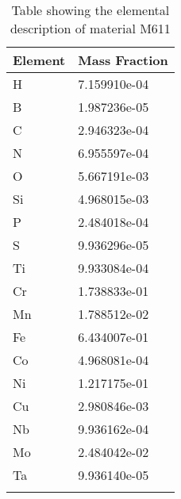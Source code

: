 \begin{centering}
\begin{longtable}[ht!]
\caption{Table showing the elemental description of material M613}
\label{table:material_M613}
\end{longtable}
\clearpage

\begin{longtable}[ht!]
{ p{} | p{} }
\hline
Element & Mass Fraction\\
\hline
H &  7.159910e-04\\
B &  1.987236e-05\\
C &  2.946323e-04\\
N &  6.955597e-04\\
O &  5.667191e-03\\
Si &  4.968015e-03\\
P &  2.484018e-04\\
S &  9.936296e-05\\
Ti &  9.933084e-04\\
Cr &  1.738833e-01\\
Mn &  1.788512e-02\\
Fe &  6.434007e-01\\
Co &  4.968081e-04\\
Ni &  1.217175e-01\\
Cu &  2.980846e-03\\
Nb &  9.936162e-04\\
Mo &  2.484042e-02\\
Ta &  9.936140e-05\\

\caption{Table showing the elemental description of material M611}
\label{table:material_M611}
\end{longtable}
\clearpage


\end{centering}
